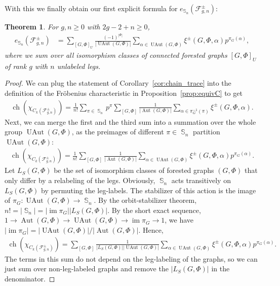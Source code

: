 \documentclass[oneside]{amsart}
\newtheorem{theorem}{Theorem}[section]
\theoremstyle{remark}
\DeclareMathOperator{\SG}{{\mathbb S}}
\newcommand{\Aut}{{\operatorname{Aut}}}
\newcommand{\UAut}{{\operatorname{UAut}}}
\newcommand{\ch}{\operatorname{ch}}
\DeclareMathOperator{\im}{im}
\newcommand{\F}{\mathcal{F}}
\begin{document}
With this we finally obtain our first explicit formula for $e_{\SG_n}(\F^\pm_{g,n})$:
\begin{theorem}
For $g,n \geq 0$ with $2g - 2 + n \geq 0$, %
%
%
%
%
\label{thm:equiv}
\begin{align*} e_{\SG_n}(\F^\pm_{g,n}) &= \sum_{[G,\Phi]_U} \frac{(-1)^{|\Phi|}}{|\UAut(G,\Phi)|} \sum_{\alpha \in \UAut(G,\Phi)} \xi^\pm(G,\Phi,\alpha) p^{\pi_G(\alpha)}, \end{align*}
where we sum over all isomorphism classes of connected forested graphs $[G,\Phi]_U$ of rank $g$ with $n$ \emph{unlabeled} legs.

\end{theorem}
\begin{proof}
We can plug the statement of Corollary~\ref{cor:chain_trace} into the definition of the Fr\"obenius characteristic in Proposition~\ref{prop:equivC} to get
\begin{align*} \ch(\chi_{C_k(\F^\pm_{g,n})}) = \frac{1}{n!} \sum_{\pi \in \SG_n} p^\pi \sum_{[G,\Phi]} \frac{1}{|\Aut(G,\Phi)|} \sum_{\alpha \in \pi_G^{-1}(\pi)} \xi^\pm(G,\Phi,\alpha). \end{align*}
%
Next, we can merge the first and the third sum into a summation over the whole group $\UAut(G,\Phi)$, 
as the preimages of different $\pi \in \SG_n$ partition $\UAut(G,\Phi)$:
\begin{align*} \ch(\chi_{C_k(\F^\pm_{g,n})}) = \frac{1}{n!} \sum_{[G,\Phi]} \frac{1}{|\Aut(G,\Phi)|} \sum_{\alpha \in \UAut(G,\Phi)} \xi^\pm(G,\Phi,\alpha) p^{\pi_G(\alpha)} . \end{align*}
Let $L_S(G,\Phi)$ be the set of isomorphism classes of forested graphs $(G,\Phi)$ that only differ by a relabeling of the legs.
%
%
%
%
%
%
Obviously, $\SG_n$ acts transitively on $L_S(G,\Phi)$ by permuting the leg-labels.  The stabilizer of this action is the image of $\pi_G:\UAut(G,\Phi)\rightarrow \SG_n$.
By the orbit-stabilizer theorem, $n! = |\SG_n| = |\im \pi_G| |L_S(G,\Phi)|$.
By the short exact sequence, $1 \rightarrow \Aut(G,\Phi) \rightarrow \UAut(G,\Phi ) \rightarrow \im \pi_G \rightarrow 1$, we have $|\im \pi_G| = |\UAut(G,\Phi)|/ |\Aut(G,\Phi)|$. Hence,
\begin{align*} \ch(\chi_{C_k(\F^\pm_{g,n})}) = \sum_{[G,\Phi]} \frac{1}{|L_S(G,\Phi)| |\UAut(G,\Phi)|} \sum_{\alpha \in \UAut(G,\Phi)} \xi^\pm(G,\Phi,\alpha) p^{\pi_G(\alpha)} . \end{align*}
The terms in this sum do not depend on the leg-labeling of the graphs, so we can just sum over non-leg-labeled graphs and remove the $|L_S(G,\Phi)|$ in the denominator.
\end{proof}
\end{document}
